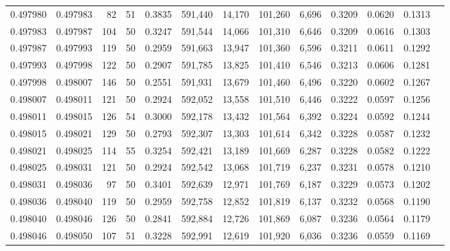 \begin{tabular}{rrrrrrrrrrrrr}
0.497980 & 0.497983 &    82 &  51 &                                     0.3835 & 591,440 &  14,170 & 101,260 &   6,696 & 0.3209 & 0.0620 & 0.1313 \\
0.497983 & 0.497987 &   104 &  50 &                                     0.3247 & 591,544 &  14,066 & 101,310 &   6,646 & 0.3209 & 0.0616 & 0.1303 \\
0.497987 & 0.497993 &   119 &  50 &                                     0.2959 & 591,663 &  13,947 & 101,360 &   6,596 & 0.3211 & 0.0611 & 0.1292 \\
0.497993 & 0.497998 &   122 &  50 &                                     0.2907 & 591,785 &  13,825 & 101,410 &   6,546 & 0.3213 & 0.0606 & 0.1281 \\
0.497998 & 0.498007 &   146 &  50 &                                     0.2551 & 591,931 &  13,679 & 101,460 &   6,496 & 0.3220 & 0.0602 & 0.1267 \\
0.498007 & 0.498011 &   121 &  50 &                                     0.2924 & 592,052 &  13,558 & 101,510 &   6,446 & 0.3222 & 0.0597 & 0.1256 \\
0.498011 & 0.498015 &   126 &  54 &                                     0.3000 & 592,178 &  13,432 & 101,564 &   6,392 & 0.3224 & 0.0592 & 0.1244 \\
0.498015 & 0.498021 &   129 &  50 &                                     0.2793 & 592,307 &  13,303 & 101,614 &   6,342 & 0.3228 & 0.0587 & 0.1232 \\
0.498021 & 0.498025 &   114 &  55 &                                     0.3254 & 592,421 &  13,189 & 101,669 &   6,287 & 0.3228 & 0.0582 & 0.1222 \\
0.498025 & 0.498031 &   121 &  50 &                                     0.2924 & 592,542 &  13,068 & 101,719 &   6,237 & 0.3231 & 0.0578 & 0.1210 \\
0.498031 & 0.498036 &    97 &  50 &                                     0.3401 & 592,639 &  12,971 & 101,769 &   6,187 & 0.3229 & 0.0573 & 0.1202 \\
0.498036 & 0.498040 &   119 &  50 &                                     0.2959 & 592,758 &  12,852 & 101,819 &   6,137 & 0.3232 & 0.0568 & 0.1190 \\
0.498040 & 0.498046 &   126 &  50 &                                     0.2841 & 592,884 &  12,726 & 101,869 &   6,087 & 0.3236 & 0.0564 & 0.1179 \\
0.498046 & 0.498050 &   107 &  51 &                                     0.3228 & 592,991 &  12,619 & 101,920 &   6,036 & 0.3236 & 0.0559 & 0.1169 \\

\end{tabular}
